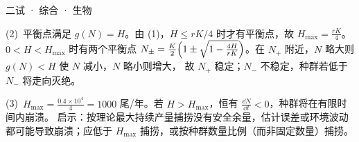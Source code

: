 \documentclass[cjk=noto, seal=first]{mojing-exam}
\begin{document}
\begin{paper}[time={建议 1.5 小时（训练设置）}, full=100]{二试 · 综合 · 生物}
\begin{questions}
\begin{solution}
(2)~平衡点满足 $g(N)=H$。由 (1)，$H\le rK/4$ 时才有平衡点，故 $H_{\max}=\frac{rK}4$。
$0<H<H_{\max}$ 时有两个平衡点 $N_\pm=\frac K2\Bigl(1\pm\sqrt{1-\frac{4H}{rK}}\Bigr)$。在 $N_+$ 附近，$N$ 略大则 $g(N)<H$ 使 $N$ 减小，$N$ 略小则增大，
故 $N_+$ 稳定；$N_-$ 不稳定，种群若低于 $N_-$ 将走向灭绝。

(3)~$H_{\max}=\frac{0.4\times10^4}{4}=1000$ 尾/年。若 $H>H_{\max}$，恒有 $\frac{\dd N}{\dd t}<0$，种群将在有限时间内崩溃。
启示：按理论最大持续产量捕捞没有安全余量，估计误差或环境波动都可能导致崩溃；应低于 $H_{\max}$ 捕捞，或按种群数量比例（而非固定数量）捕捞。
\end{solution}

\end{questions}
\end{paper}
\end{document}
